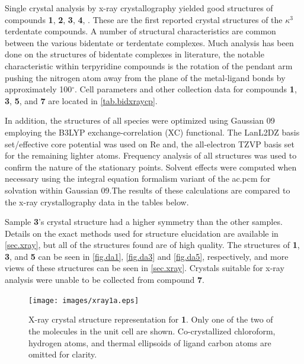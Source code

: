 Single crystal analysis by x-ray crystallography yielded good structures of compounds \textbf{1}, \textbf{2}, \textbf{3}, \textbf{4}, . These are the first reported crystal structures of the $\kappa ^3$ terdentate  compounds. A number of structural characteristics are common between the various bidentate or terdentate complexes. Much analysis has been done on the structures of bidentate complexes in literature, the notable characteristic within terpyridine compounds is the rotation of the pendant arm pushing the nitrogen atom away from the plane of the metal-ligand bonds by approximately 100$^\circ$. Cell parameters and other collection data for compounds \textbf{1}, \textbf{3}, \textbf{5}, and \textbf{7} are located in \autoref{tab.bidxraycp}.

In addition, the structures of all species were optimized using Gaussian 09\autocite{gaussian} employing the B3LYP\autocite{becke1993, lee1988}  exchange-correlation (XC) functional. The LanL2DZ basis set/effective core potential\autocite{hay1985} was used on Re and, the all-electron TZVP basis set\autocite{schafer1994} for the remaining lighter atoms. Frequency analysis of all structures was used to confirm the nature of the stationary points. Solvent effects were computed when necessary using the integral equation formalism variant of the \gls{ac.pcm} for solvation within Gaussian 09\autocite{tomasi2005, scalmani2006}.The results of these calculations are compared to the x-ray crystallography data in the tables below.


Sample \textbf{3}'s crystal structure had a higher symmetry than the other samples. Details on the exact methods used for structure elucidation are available in \autoref{sec.xray}, but all of the structures found are of high quality. The structures of \textbf{1}, \textbf{3}, and \textbf{5} can be seen in \autoref{fig.da1}, \autoref{fig.da3} and \autoref{fig.da5}, respectively, and more views of these structures can be seen in \autoref{sec.xray}. Crystals suitable for x-ray analysis were unable to be collected from compound \textbf{7}. 

\begin{figure}[!htbp]
 \begin{center}
  \texttt{[image: images/xray1a.eps]}
 \end{center}
\caption[X-ray crystal structure representation for \textbf{1}.]{X-ray crystal structure representation for \textbf{1}. Only one of the two of the molecules in the unit cell are shown. Co-crystallized chloroform, hydrogen atoms, and thermal ellipsoids of ligand carbon atoms are omitted for clarity.}
\label{fig.da1}
\end{figure}

